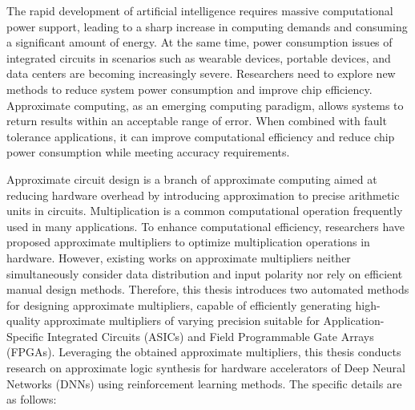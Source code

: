 \begin{abstract*}
    The rapid development of artificial intelligence requires massive computational power support, leading to a sharp increase in computing demands and consuming a significant amount of energy. At the same time, power consumption issues of integrated circuits in scenarios such as wearable devices, portable devices, and data centers are becoming increasingly severe. Researchers need to explore new methods to reduce system power consumption and improve chip efficiency. Approximate computing, as an emerging computing paradigm, allows systems to return results within an acceptable range of error. When combined with fault tolerance applications, it can improve computational efficiency and reduce chip power consumption while meeting accuracy requirements.
    
    Approximate circuit design is a branch of approximate computing aimed at reducing hardware overhead by introducing approximation to precise arithmetic units in circuits. Multiplication is a common computational operation frequently used in many applications. To enhance computational efficiency, researchers have proposed approximate multipliers to optimize multiplication operations in hardware. However, existing works on approximate multipliers neither simultaneously consider data distribution and input polarity nor rely on efficient manual design methods. Therefore, this thesis introduces two automated methods for designing approximate multipliers, capable of efficiently generating high-quality approximate multipliers of varying precision suitable for Application-Specific Integrated Circuits (ASICs) and Field Programmable Gate Arrays (FPGAs). Leveraging the obtained approximate multipliers, this thesis conducts research on approximate logic synthesis for hardware accelerators of Deep Neural Networks (DNNs) using reinforcement learning methods. The specific details are as follows:
    

\end{abstract*}

